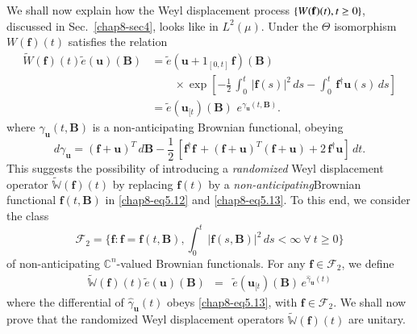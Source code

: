We shall now explain how the Weyl displacement process $\{W(\mathbf{f})(t),\break t\geq 0\}$, discussed in Sec.\ \ref{chap8-sec4}, looks like in $L^2(\mu)$. Under the $\Theta$ isomorphism $W(\mathbf{f})(t)$ satisfies the relation   
\begin{align}
\widetilde{W}(\mathbf{f})(t)\widetilde{e}(\mathbf{u})(\mathbf{B}) &= \widetilde{e}(\mathbf{u}+1_{[0,t]}\, \mathbf{f})(\mathbf{B}) \, \,\nonumber \\ 
& \qquad \times {\exp}\left[-\frac{1}{2}\, \int_0^t\, \vert \mathbf{f}(s)\vert^2\, ds -\int_0^t\, \mathbf{f}^\dag\mathbf{u}(s)\, ds\right] \nonumber \\
&=\widetilde{e}(\mathbf{u}_{[t})(\mathbf{B})\,\, e^{\gamma_{\mathbf{u}}(t,\mathbf{B})}. 
\label{chap8-eq5.12}
\end{align}     
where $\gamma_{\mathbf{u}}(t,\mathbf{B})$ is a non-anticipating Brownian functional, obeying  
\begin{equation} 
d\gamma_{\mathbf{u}}=  (\mathbf{f}+\mathbf{u})^T\, d\mathbf{B}-\frac{1}{2}\,\left[ \mathbf{f}^\dag\mathbf{f}\, +
(\mathbf{f}+\mathbf{u})^T(\mathbf{f}+\mathbf{u})+2\,\mathbf{f}^\dag\mathbf{u} \right]\, dt. \label{chap8-eq5.13}
\end{equation}
This suggests the possibility of introducing a {\it randomized} Weyl displacement operator $\widetilde{\mathbb{W}}(\mathbf{f})(t)$ by replacing $\mathbf{f}(t)$ by a {\it non-anticipating}\break Brownian functional $\mathbf{f}(t,\mathbf{B})$ in \eqref{chap8-eq5.12} and  \eqref{chap8-eq5.13}. To this end, we consider the class  
$$
\mathcal{F}_2 = \{\mathbf{f}: \mathbf{f}=\mathbf{f}(t,\mathbf{B}), \int_{0}^{t}\, \vert \mathbf{f}(s,\mathbf{B})\vert^2\, ds <\infty \ \forall\ t\geq 0\}
$$  
of non-anticipating  $\mathbb{C}^n$-valued   Brownian functionals.  For any $\mathbf{f}\in \mathcal{F}_2$, we define
\begin{eqnarray}
\widetilde{\mathbb{W}}(\mathbf{f})(t)\widetilde{e}(\mathbf{u})(\mathbf{B})&=&
\widetilde{e}(\mathbf{u}_{[t})(\mathbf{B})\, e^{\hat{\gamma}_\mathbf{u}(t)} \label{chap8-eq5.14}
\end{eqnarray}  
where the differential of $\hat{\gamma}_\mathbf{u}(t)$ obeys  \eqref{chap8-eq5.13}, with $\mathbf{f}\in \mathcal{F}_2$.  We shall now prove that the randomized Weyl displacement operators $\widetilde{\mathbb{W}}(\mathbf{f})(t)$ are unitary.  

